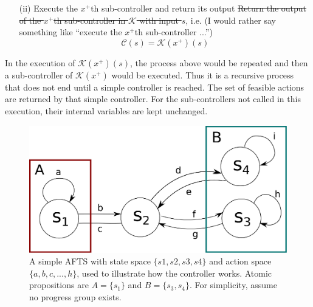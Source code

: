 \begin{definition}
\begin{itemize}
		\item[(ii)] Execute the $ x^+ $th sub-controller and return its output \sout{Return the output of the $ x^+ $th sub-controller in $ \mathcal{K} $ with input $ s $}, i.e.  {\color{purple} (I would rather say something like ``execute the $x^+$th sub-controller ...'')}
		\begin{displaymath}
		\mathcal{C}(s) = \mathcal{K}(x^+)(s)
		\end{displaymath}
	\end{itemize}
	
	In the execution of $ \mathcal{K}(x^+)(s) $, the process above would be repeated and then a sub-controller of $ \mathcal{K}(x^+) $ would be executed. Thus it is a recursive process that does not end until a simple controller is reached.
	The set of feasible actions are returned by that simple controller. For the sub-controllers not called in this execution, their internal variables are kept unchanged.
	
	
	\label{def:exec}
\end{definition}


\begin{figure}
	\centering
	\includegraphics[width=0.4\linewidth]{pic/eg1}
	\caption{A simple AFTS with state space $\{s1,s2,s3,s4\}$ and action space $\{a,b,c, ...,h\}$, used to illustrate how the controller works. Atomic propositions are $ A =\{s_1\} $ and $ B=\{s_3, s_4\} $. For simplicity, assume no progress group exists.}  
	\label{fig:eg1}
\end{figure}

